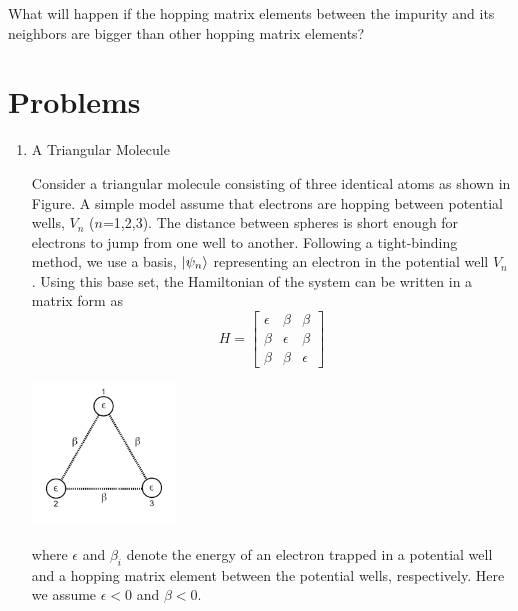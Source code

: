 {\exercise
What will happen if the hopping matrix elements between the impurity and its neighbors are bigger than other hopping matrix elements?


\newpage
\section{Problems}

\begin{enumerate}[labelwidth=0.5cm,labelindent=0cm,leftmargin=*,label=\bfseries \thechapter.\arabic*,align=left]

\item A Triangular Molecule

\begin{minipage}{4.5in}
Consider a triangular molecule consisting of three identical atoms as shown in Figure. A simple model assume that electrons are hopping between potential wells, $V_n$ ($n$=1,2,3).
The distance between spheres is short enough for
electrons to jump from one well to another.  Following a tight-binding method,
we use a basis, $\ket{\psi_n}$ 
representing an electron in the potential well $V_n$ .  Using this base set, the Hamiltonian of the system can be written in a matrix form as
\begin{equation}
H  = 
\begin{bmatrix}
\epsilon & \beta & \beta \\
\beta & \epsilon & \beta \\
\beta & \beta & \epsilon
\end{bmatrix}
\end{equation}
\end{minipage}
\begin{minipage}{1.9in}
\hfill\includegraphics[width=1.5in]{10.matrix3/trimer.pdf} 
\end{minipage}
where $\epsilon$ and $\beta_i$ denote the energy of an electron trapped
in a potential well and a hopping matrix element between the potential wells,
respectively.  Here we assume $\epsilon < 0$ and $\beta < 0$. 


\end{enumerate}}
